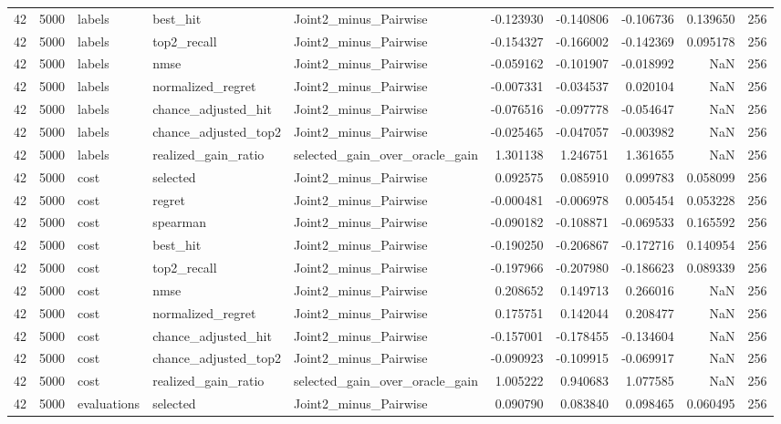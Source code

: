 \begin{tabular}{rrlllrrrrr}
42 & 5000 & labels & best_hit & Joint2_minus_Pairwise & -0.123930 & -0.140806 & -0.106736 & 0.139650 & 256 \\
42 & 5000 & labels & top2_recall & Joint2_minus_Pairwise & -0.154327 & -0.166002 & -0.142369 & 0.095178 & 256 \\
42 & 5000 & labels & nmse & Joint2_minus_Pairwise & -0.059162 & -0.101907 & -0.018992 & NaN & 256 \\
42 & 5000 & labels & normalized_regret & Joint2_minus_Pairwise & -0.007331 & -0.034537 & 0.020104 & NaN & 256 \\
42 & 5000 & labels & chance_adjusted_hit & Joint2_minus_Pairwise & -0.076516 & -0.097778 & -0.054647 & NaN & 256 \\
42 & 5000 & labels & chance_adjusted_top2 & Joint2_minus_Pairwise & -0.025465 & -0.047057 & -0.003982 & NaN & 256 \\
42 & 5000 & labels & realized_gain_ratio & selected_gain_over_oracle_gain & 1.301138 & 1.246751 & 1.361655 & NaN & 256 \\
42 & 5000 & cost & selected & Joint2_minus_Pairwise & 0.092575 & 0.085910 & 0.099783 & 0.058099 & 256 \\
42 & 5000 & cost & regret & Joint2_minus_Pairwise & -0.000481 & -0.006978 & 0.005454 & 0.053228 & 256 \\
42 & 5000 & cost & spearman & Joint2_minus_Pairwise & -0.090182 & -0.108871 & -0.069533 & 0.165592 & 256 \\
42 & 5000 & cost & best_hit & Joint2_minus_Pairwise & -0.190250 & -0.206867 & -0.172716 & 0.140954 & 256 \\
42 & 5000 & cost & top2_recall & Joint2_minus_Pairwise & -0.197966 & -0.207980 & -0.186623 & 0.089339 & 256 \\
42 & 5000 & cost & nmse & Joint2_minus_Pairwise & 0.208652 & 0.149713 & 0.266016 & NaN & 256 \\
42 & 5000 & cost & normalized_regret & Joint2_minus_Pairwise & 0.175751 & 0.142044 & 0.208477 & NaN & 256 \\
42 & 5000 & cost & chance_adjusted_hit & Joint2_minus_Pairwise & -0.157001 & -0.178455 & -0.134604 & NaN & 256 \\
42 & 5000 & cost & chance_adjusted_top2 & Joint2_minus_Pairwise & -0.090923 & -0.109915 & -0.069917 & NaN & 256 \\
42 & 5000 & cost & realized_gain_ratio & selected_gain_over_oracle_gain & 1.005222 & 0.940683 & 1.077585 & NaN & 256 \\
42 & 5000 & evaluations & selected & Joint2_minus_Pairwise & 0.090790 & 0.083840 & 0.098465 & 0.060495 & 256 \\

\end{tabular}
